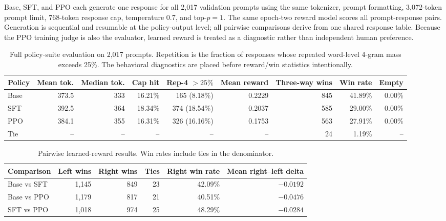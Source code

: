 \documentclass[10pt,twocolumn]{article}
\begin{document}
Base, SFT, and PPO each generate one response for all 2,017 validation prompts
using the same tokenizer, prompt formatting, 3,072-token prompt limit,
768-token response cap, temperature 0.7, and top-$p=1$. The same epoch-two
reward model scores all prompt-response pairs. Generation is sequential and
resumable at the policy-output level; all pairwise comparisons derive from one
shared response table. Because the PPO training judge is also the evaluator,
learned reward is treated as a diagnostic rather than independent human
preference.

\begin{table}[t]
\centering
\scriptsize
\caption{Full policy-suite evaluation on 2,017 prompts. Repetition is the
fraction of responses whose repeated word-level 4-gram mass exceeds 25\%. The
behavioral diagnostics are placed before reward/win statistics intentionally.}
\label{tab:evaluation}
\begin{tabular}{@{}lrrrrrrrr@{}}
\toprule
\textbf{Policy} & \textbf{Mean tok.} & \textbf{Median tok.} &
\textbf{Cap hit} & \textbf{Rep-4 $>25\%$} & \textbf{Mean reward} &
\textbf{Three-way wins} & \textbf{Win rate} & \textbf{Empty}\\
\midrule
Base & 373.5 & 333 & 16.21\% & 165 (8.18\%) & 0.2229 & 845 & 41.89\% & 0.00\%\\
SFT & 392.5 & 364 & 18.34\% & 374 (18.54\%) & 0.2037 & 585 & 29.00\% & 0.00\%\\
PPO & 384.1 & 355 & 16.31\% & 326 (16.16\%) & 0.1753 & 563 & 27.91\% & 0.00\%\\
Tie & -- & -- & -- & -- & -- & 24 & 1.19\% & --\\
\bottomrule
\end{tabular}
\end{table}

\begin{table}[t]
\centering
\small
\caption{Pairwise learned-reward results. Win rates include ties in the
denominator.}
\label{tab:pairwise}
\begin{tabular}{@{}lrrrrr@{}}
\toprule
\textbf{Comparison} & \textbf{Left wins} & \textbf{Right wins} &
\textbf{Ties} & \textbf{Right win rate} & \textbf{Mean right--left delta}\\
\midrule
Base vs SFT & 1,145 & 849 & 23 & 42.09\% & $-0.0192$\\
Base vs PPO & 1,179 & 817 & 21 & 40.51\% & $-0.0476$\\
SFT vs PPO & 1,018 & 974 & 25 & 48.29\% & $-0.0284$\\
\bottomrule
\end{tabular}
\end{table}
\end{document}
